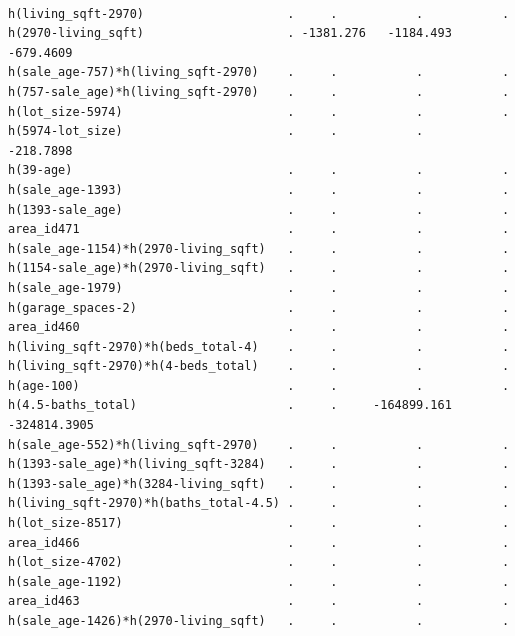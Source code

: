 \documentclass[
]{article}
\begin{document}
\begin{verbatim}
                                                                           
h(living_sqft-2970)                    .     .           .           .     
h(2970-living_sqft)                    . -1381.276   -1184.493    -679.4609
h(sale_age-757)*h(living_sqft-2970)    .     .           .           .     
h(757-sale_age)*h(living_sqft-2970)    .     .           .           .     
h(lot_size-5974)                       .     .           .           .     
h(5974-lot_size)                       .     .           .        -218.7898
h(39-age)                              .     .           .           .     
h(sale_age-1393)                       .     .           .           .     
h(1393-sale_age)                       .     .           .           .     
area_id471                             .     .           .           .     
h(sale_age-1154)*h(2970-living_sqft)   .     .           .           .     
h(1154-sale_age)*h(2970-living_sqft)   .     .           .           .     
h(sale_age-1979)                       .     .           .           .     
h(garage_spaces-2)                     .     .           .           .     
area_id460                             .     .           .           .     
h(living_sqft-2970)*h(beds_total-4)    .     .           .           .     
h(living_sqft-2970)*h(4-beds_total)    .     .           .           .     
h(age-100)                             .     .           .           .     
h(4.5-baths_total)                     .     .     -164899.161 -324814.3905
h(sale_age-552)*h(living_sqft-2970)    .     .           .           .     
h(1393-sale_age)*h(living_sqft-3284)   .     .           .           .     
h(1393-sale_age)*h(3284-living_sqft)   .     .           .           .     
h(living_sqft-2970)*h(baths_total-4.5) .     .           .           .     
h(lot_size-8517)                       .     .           .           .     
area_id466                             .     .           .           .     
h(lot_size-4702)                       .     .           .           .     
h(sale_age-1192)                       .     .           .           .     
area_id463                             .     .           .           .     
h(sale_age-1426)*h(2970-living_sqft)   .     .           .           .     
                                                                             

\end{verbatim}
\end{document}
